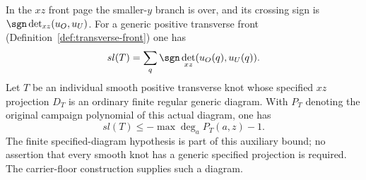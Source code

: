 \begin{theorem}
\label{fd:contact}\leanok
In the $xz$ front page the smaller-$y$ branch is over, and its crossing
sign is $\sgn\det_{xz}(u_O,u_U)$. For a generic positive transverse front
(Definition~\ref{def:transverse-front}) one has
\begin{equation}\label{fd:front-writhe}
 sl(T)=\sum_q\sgn\det_{xz}(u_O(q),u_U(q)).
\end{equation}
Let $T$ be an individual smooth positive transverse knot whose specified
$xz$ projection $D_T$ is an ordinary finite regular generic diagram.
With $P_T$ denoting the original campaign polynomial of this actual
diagram, one has
\begin{equation}\label{fd:representative-bound}
 sl(T)\leq-\max\deg_a P_T(a,z)-1.
\end{equation}
The finite specified-diagram hypothesis is part of this auxiliary bound;
no assertion that every smooth knot has a generic specified projection
is required. The carrier-floor construction supplies such a diagram.

\end{theorem}
